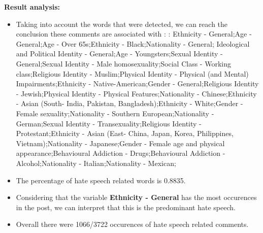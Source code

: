 \documentclass[11pt]{article}
\begin{document}
\textbf{\Large Result analysis:}

\begin{itemize}\item Taking into account the words that were detected, we can reach the conclusion these comments are associated with : : Ethnicity - General;Age - General;Age - Over 65s;Ethnicity - Black;Nationality - General; Ideological and Political Identity - General;Age - Youngsters;Sexual Identity - General;Sexual Identity - Male homosexuality;Social Class - Working class;Religious Identity - Muslim;Physical Identity - Physical (and Mental) Impairments;Ethnicity - Native-American;Gender - General;Religious Identity - Jewish;Physical Identity - Physical Features;Nationality - Chinese;Ethnicity - Asian (South- India, Pakistan, Bangladesh);Ethnicity - White;Gender - Female sexuality;Nationality - Southern European;Nationality - German;Sexual Identity - Transexuality;Religious Identity - Protestant;Ethnicity - Asian (East- China, Japan, Korea, Philippines, Vietnam);Nationality - Japanese;Gender - Female age and physical appearance;Behavioural Addiction - Drugs;Behavioural Addiction - Alcohol;Nationality - Italian;Nationality - Mexican;%

\item The percentage of hate speech related words is 0.8835.

\item Considering that the variable \textbf{Ethnicity - General} has the most occurences in the post, we can interpret that this is the predominant hate speech.

\item Overall there were 1066/3722 occurences of hate speech related comments.\end{itemize}
\end{document}
